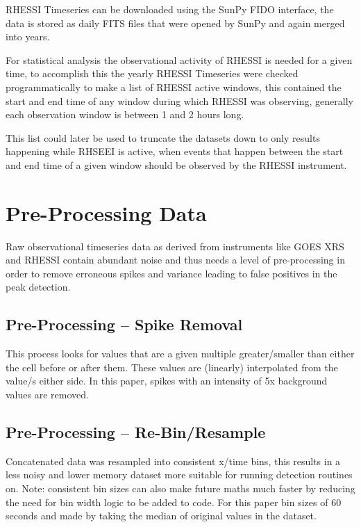 \documentclass[namedreferences]{solarphysics}
\begin{document}
\begin{article}
RHESSI Timeseries can be downloaded using the SunPy FIDO interface, the data is stored as daily FITS files that were opened by SunPy and again merged into years.

For statistical analysis the observational activity of RHESSI is needed for a given time, to accomplish this the yearly RHESSI Timeseries were checked programmatically to make a list of RHESSI active windows, this contained the start and end time of any window during which RHESSI was observing, generally each observation window is between 1 and 2 hours long. \color{red}{Should I elaborate on the reasons???}

\color{black}
This list could later be used to truncate the datasets down to only results happening while RHSEEI is active, when events that happen between the start and end time of a given window should be observed by the RHESSI instrument.


\section{Pre-Processing Data}
     \label{S-Pre-Processing}

Raw observational timeseries data as derived from instruments like GOES XRS and RHESSI contain abundant noise and thus needs a level of pre-processing in order to remove erroneous spikes and variance leading to false positives in the peak detection.

\subsection{Pre-Processing – Spike Removal} %
\label{SS-PP-Spike-Removal}

This process looks for values that are a given multiple greater/smaller than either the cell before or after them. These values are (linearly) interpolated from the value/s either side. In this paper, spikes with an intensity of 5x background values are removed.



\subsection{Pre-Processing – Re-Bin/Resample} %
\label{SS-PP-Rebin}

Concatenated data was resampled into consistent x/time bins, this results in a less noisy and lower memory dataset more suitable for running detection routines on.
Note: consistent bin sizes can also make future maths much faster by reducing the need for bin width logic to be added to code.
For this paper bin sizes of 60 seconds and made by taking the median of original values in the dataset.


\end{article}
\end{document}
